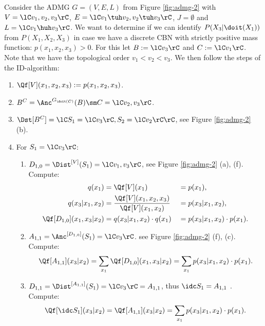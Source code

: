 \begin{Eg}
    Consider the ADMG $G=(V,E,L)$ from Figure \ref{fig:admg-2} with $V=\lC v_1,v_2,v_3 \rC$, 
    $E=\lC v_1 \tuh v_2, v_2 \tuh v_3 \rC$, $J=\emptyset$ and $L=\lC v_1 \huh v_3 \rC$.
     We want to determine if we can identify $P(X_3|\doit(X_1))$ from $P(X_1,X_2,X_3)$ in case we have a discrete CBN with strictly positive mass function: $p(x_1,x_2,x_3) >0$.  
     For this let $B:=\lC v_3 \rC$ and $C:=\lC v_1 \rC$. Note that we have the topological order $v_1 < v_2 < v_3$.
    We then follow the steps of the ID-algorithm:
    \begin{enumerate}
        \item $\Qf[V](x_1,x_2,x_3) := p(x_1,x_2,x_3)$.
        \item $B^C = \Anc^{G_{\doit(C)}}(B) \sm C = \lC v_2,v_3 \rC$.
        \item $\Dst[B^C] =\lC S_1=\lC v_3 \rC, S_2=\lC v_2 \rC   \rC$, see Figure \ref{fig:admg-2} (b).
        \item For $S_1=\lC v_3 \rC$:
            \begin{enumerate}
                \item $D_{1,0} = \Dist^{[V]}(S_1) = \lC v_1, v_3\rC$, see Figure \ref{fig:admg-2} (a), (f). Compute:
                    \begin{align*}
                        q(x_1) & = \Qf[V](x_1) &&= p(x_1),\\
                        q(x_3|x_1,x_2) & = \frac{\Qf[V](x_1,x_2,x_3)}{\Qf[V](x_1,x_2)} && = p(x_3|x_1,x_2), \\
                        \Qf[D_{1,0}](x_1,x_3|x_2) &= q(x_3|x_1,x_2) \cdot q(x_1) && = p(x_3|x_1,x_2) \cdot p(x_1).
                    \end{align*}
                \item $A_{1,1} = \Anc^{[D_{1,0}]}(S_1) = \lC v_3\rC$. see Figure \ref{fig:admg-2} (f), (c). Compute:
                    \begin{align*}
                        \Qf[A_{1,1}](x_3|x_2) = \sum_{x_1} \Qf[D_{1,0}](x_1,x_3|x_2) = \sum_{x_1} p(x_3|x_1,x_2) \cdot p(x_1).
                    \end{align*}
                \item $D_{1,1} = \Dist^{[A_{1,1}]}(S_1) = \lC v_3\rC = A_{1,1}$, thus $\idc S_1 =A_{1,1}$ . Compute:
                   \begin{align*}
                       \Qf[\idc S_1](x_3|x_2) =    \Qf[A_{1,1}](x_3|x_2) = \sum_{x_1} p(x_3|x_1,x_2) \cdot p(x_1).
                    \end{align*}

\end{enumerate}
\end{enumerate}
\end{Eg}
